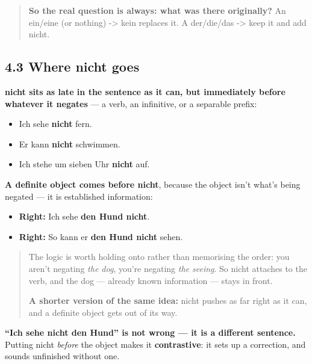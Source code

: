 \documentclass[
  11pt,
]{article}
\providecommand{\tightlist}{%
  \setlength{\itemsep}{0pt}\setlength{\parskip}{0pt}}
\begin{document}
\begin{quote}
\textbf{So the real question is always: what was there originally?} An
ein/eine (or nothing) -\textgreater{} kein replaces it. A der/die/das
-\textgreater{} keep it and add nicht.
\end{quote}

\subsection{4.3 Where nicht goes}\label{where-nicht-goes}

\textbf{nicht sits as late in the sentence as it can, but immediately
before whatever it negates} --- a verb, an infinitive, or a separable
prefix:

\begin{itemize}
\tightlist
\item
  Ich sehe \textbf{nicht} fern.
\item
  Er kann \textbf{nicht} schwimmen.
\item
  Ich stehe um sieben Uhr \textbf{nicht} auf.
\end{itemize}

\textbf{A definite object comes before nicht}, because the object isn't
what's being negated --- it is established information:

\begin{itemize}
\tightlist
\item
  \textbf{Right:} Ich sehe \textbf{den Hund nicht}.
\item
  \textbf{Right:} So kann er \textbf{den Hund nicht} sehen.
\end{itemize}

\begin{quote}
The logic is worth holding onto rather than memorising the order: you
aren't negating \emph{the dog}, you're negating \emph{the seeing}. So
nicht attaches to the verb, and the dog --- already known information
--- stays in front.

\textbf{A shorter version of the same idea:} nicht pushes as far right
as it can, and a definite object gets out of its way.
\end{quote}

\textbf{``Ich sehe nicht den Hund'' is not wrong --- it is a different
sentence.} Putting nicht \emph{before} the object makes it
\textbf{contrastive}: it sets up a correction, and sounds unfinished
without one.
\end{document}
